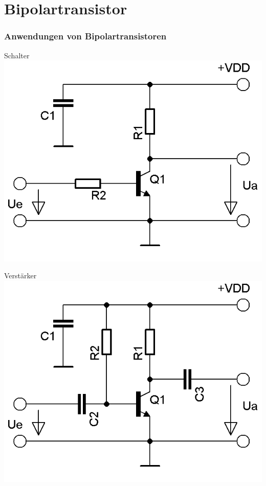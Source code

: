 \section*{Bipolar\-transistor}
\begin{frame}
  \frametitle{Anwendungen von Bipolartransistoren}
	\begin{minipage}{0.4\textwidth}
		\begin{center}
			{\Large Schalter}
			\includegraphics[width=\textwidth,height=.7\textheight,keepaspectratio]{a06/Transistor-Schalter.png}\\
		\end{center}	
	\end{minipage}
	\hspace{3mm}
	\begin{minipage}{0.4\textwidth}
		\begin{center}
			{\Large Verstärker}
			\includegraphics[width=\textwidth,height=.7\textheight,keepaspectratio]{a06/Transistor-Verstaerker.png}\\

\end{center}
\end{minipage}
\end{frame}
